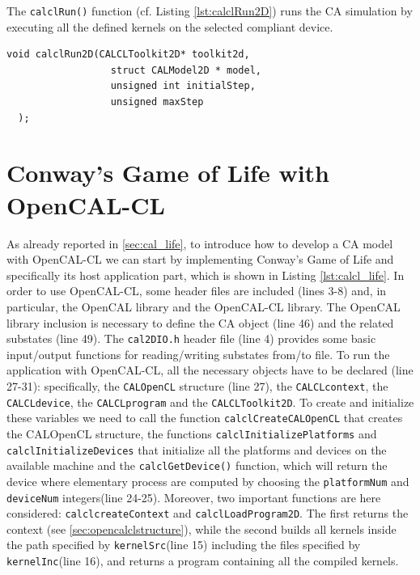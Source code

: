 The \verb'calclRun()' function (cf. Listing \ref{lst:calclRun2D}) runs the CA simulation by executing
all the defined kernels on the selected compliant device.

\begin{lstlisting}[float,floatplacement=H, label=lst:calclRun2D, caption=The calclRun2D function., numbers=none]
  void calclRun2D(CALCLToolkit2D* toolkit2d,
                  struct CALModel2D * model,
                  unsigned int initialStep,
                  unsigned maxStep
  );
\end{lstlisting}


\section{Conway's Game of Life with OpenCAL-CL}
 
As already reported in \ref{sec:cal_life}, to introduce how to develop
a CA model with OpenCAL-CL we can start by implementing Conway’s Game
of Life and specifically its host application part, which is shown in
Listing \ref{lst:calcl_life}. In order to use OpenCAL-CL, some header
files are included (lines 3-8) and, in particular, the OpenCAL library
and the OpenCAL-CL library. The OpenCAL library inclusion is necessary
to define the CA object (line 46) and the related substates (line
49). The \verb'cal2DIO.h' header file (line 4) provides some basic
input/output functions for reading/writing substates from/to file. To
run the application with OpenCAL-CL, all the necessary objects have to
be declared (line 27-31): specifically, the \verb'CALOpenCL' structure
(line 27), the \verb'CALCLcontext', the \verb'CALCLdevice', the
\verb'CALCLprogram' and the \verb'CALCLToolkit2D'. To create and
initialize these variables we need to call the function
\verb'calclCreateCALOpenCL' that creates the CALOpenCL structure, the
functions \verb|calclInitializePlatforms| and
\verb|calclInitializeDevices| that initialize all the platforms and
devices on the available machine and the \verb'calclGetDevice()'
function, which will return the device where elementary process are
computed by choosing the \verb'platformNum' and \verb'deviceNum'
integers(line 24-25). Moreover, two important functions are here
considered: \verb'calclcreateContext' and
\verb'calclLoadProgram2D'. The first returns the context
(see \ref{sec:opencalclstructure}), while the second builds all kernels inside
the path specified by \verb'kernelSrc'(line 15) including the files
specified by \verb'kernelInc'(line 16), and returns a program
containing all the compiled kernels.

